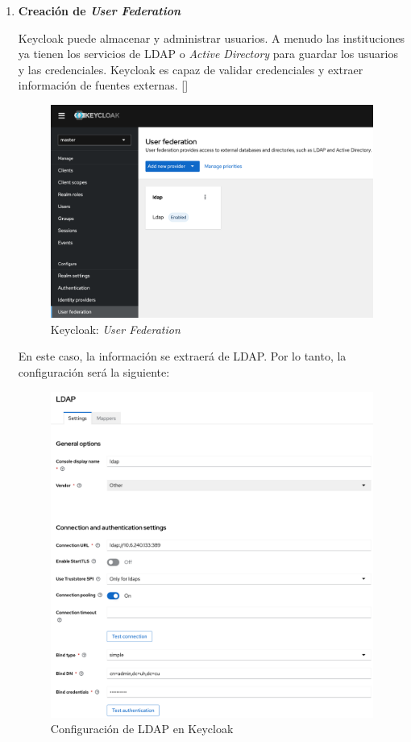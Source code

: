 \begin{enumerate}
	\item \textbf{Creación de \textit{User Federation}}
	
	Keycloak puede almacenar y administrar usuarios. A menudo las instituciones ya tienen los servicios de LDAP o \textit{Active Directory} para guardar los usuarios y las credenciales. Keycloak es capaz de validar credenciales y extraer información de fuentes externas. [\cite{keycloak_2022}]
	
	\begin{figure}[H]
		\centering
		\includegraphics[width=1\linewidth]{"Graphics/keycloak_user federation"}
		\caption{Keycloak: \textit{User Federation}}
		\label{fig:keycloakuser-federation}
	\end{figure}
	
	
	En este caso, la información se extraerá de LDAP. Por lo tanto, la configuración será la siguiente:
	
	\begin{figure}[H]
		\centering
		\includegraphics[width=0.9\linewidth]{Graphics/keycloak_configuracion_ldap1}
		\caption{Configuración de LDAP en Keycloak}
		\label{fig:keycloakconfiguracionldap1}
	\end{figure}
	

\end{enumerate}
